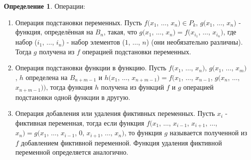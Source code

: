 \documentclass[a4paper, 12pt]{article}
\theoremstyle{definition}
\newtheorem*{definition}{Определение}
\theoremstyle{plain}
\theoremstyle{remark}
\begin{document}
  \begin{definition}
    Операции:
    \begin{enumerate}
      \item Операция подстановки переменных. Пусть $f(x_1$, $\ldots$, $x_n)\in P_k$, $g(x_1$, $\ldots$, $x_n)$ - функция, определённая на $B_n$, такая, что $g(x_1$, $\ldots$, $x_n)=f(x_{i_1}$, $\ldots$, $x_{i_n})$, где набор ($i_1$, $\ldots$, $i_n$) - набор элементов ($1$, $\ldots$, $n$) (они необязательно различны). Тогда $g$ получена из $f$ операцией подстановки переменных.
      \item Операция подстановки функции в функцию. Пусть $f(x_1$, $\ldots$, $x_n)$, $g(x_1$, $\ldots$, $x_m)$, $h$ определена на $B_{n+m-1}$ и $h(x_1$, $\ldots$, $x_{n+m-1})=f(x_1$, $\ldots$, $x_{n-1}$, $g(x_n$, $\ldots$, $x_{n+m-1}))$, тогда функция $h$ получена из функций $f$ и $g$ операцией подстановки одной функции в другую.
      \item Операция добавления или удаления фиктивных переменных. Пусть $x_i$ - фиктивная переменная, тогда если функция $f(x_1$, $\ldots$, $x_{i-1}$, $x_{i+1}$, $\ldots$, $x_n)=g(x_1$, $\ldots$, $x_{i-1}$, $0$, $x_{i+1}$, $\ldots$, $x_n)$, то функция $g$ называется полученной из $f$ добавлением фиктивной переменной. Функция удаления фиктивной переменной определяется аналогично.
    \end{enumerate}
  \end{definition}
\end{document}
